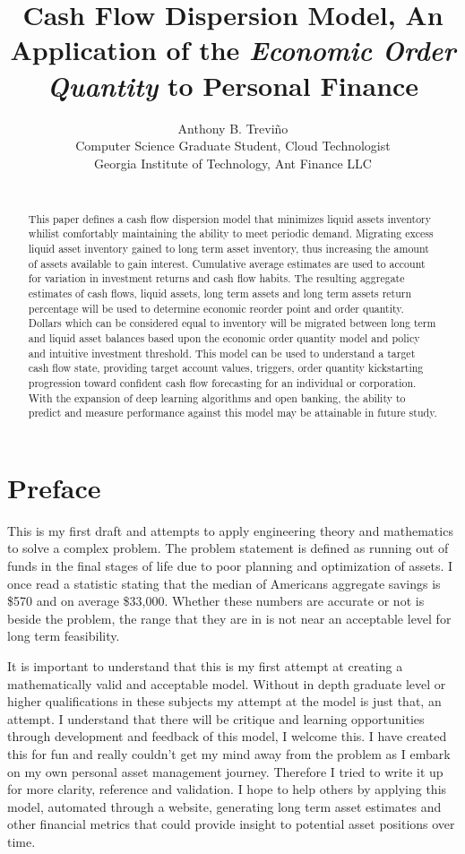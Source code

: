 \documentclass{article}
\title{Cash Flow Dispersion Model,  An Application of the \emph{Economic Order Quantity} to Personal Finance}
\author{\hspace{1mm}Anthony B. Trevi\~{n}o\\
	Computer Science Graduate Student, Cloud Technologist\\
	Georgia Institute of Technology, Ant Finance LLC\\
	\text{trevino293@gmail.com} \\
}
\begin{document}
\maketitle

\begin{abstract}

This paper defines a cash flow dispersion model that minimizes liquid assets inventory whilist comfortably maintaining the ability to meet periodic demand. Migrating excess liquid asset inventory gained to long term asset inventory, thus increasing the amount of assets available to gain interest. Cumulative average estimates are used to account for variation in investment returns and cash flow habits. The resulting aggregate estimates of cash flows, liquid assets, long term assets and long term assets return percentage will be used to determine economic reorder point and order quantity. Dollars which can be considered equal to inventory will be migrated between long term and liquid asset balances based upon the economic order quantity model and policy and intuitive investment threshold. This model can be used to understand a target cash flow state, providing target account values, triggers, order quantity kickstarting progression toward confident cash flow forecasting for an individual or corporation. With the expansion of deep learning algorithms and open banking, the ability to predict and measure performance against this model may be attainable in future study. 

\end{abstract}



\section{Preface}
This is my first draft and attempts to apply engineering theory and mathematics to solve a complex problem. The problem statement is defined as running out of funds in the final stages of life due to poor planning and optimization of assets. I once read a statistic stating that the median of Americans aggregate savings is \$570 and on average \$33,000. Whether these numbers are accurate or not is beside the problem, the range that they are in is not near an acceptable level for long term feasibility.

It is important to understand that this is my first attempt at creating a mathematically valid and acceptable model. Without in depth graduate level or higher qualifications in these subjects my attempt at the model is just that, an attempt. I understand that there will be critique and learning opportunities through development and feedback of this model, I welcome this. I have created this for fun and really couldn't get my mind away from the problem as I embark on my own personal asset management journey. Therefore I tried to write it up for more clarity, reference and validation. I hope to help others by applying this model, automated through a website, generating long term asset estimates and other financial metrics that could provide insight to potential asset positions over time.
\end{document}
